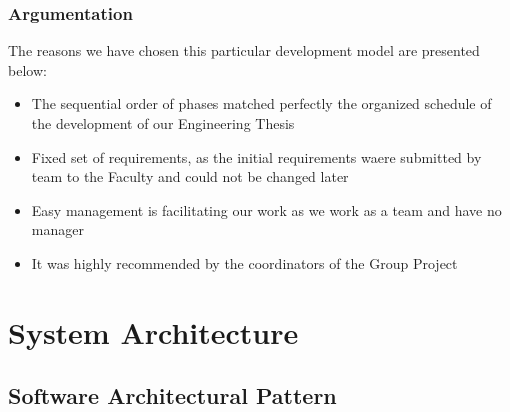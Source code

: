 \documentclass[a4paper,11pt,twoside]{report}
\theoremstyle{definition}
\begin{document}
\subsection{Argumentation}

The reasons we have chosen this particular development model are presented below:
\begin{itemize}
\item The sequential order of phases matched perfectly the organized schedule of the development of our Engineering Thesis

\item Fixed set of requirements, as the initial requirements waere submitted by team to the Faculty and could not be changed later
\item Easy management is facilitating our work as we work as a team and have no manager
\item It was highly recommended by the coordinators of the Group Project
\end{itemize}







\chapter{System Architecture}



\section{Software Architectural Pattern}
\end{document}
